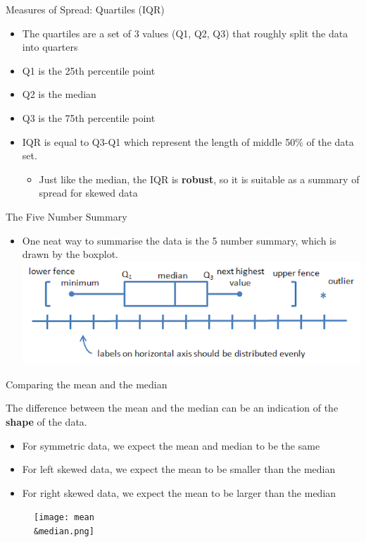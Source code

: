 \documentclass[ignorenonframetext,]{beamer}
\providecommand{\tightlist}{%
  \setlength{\itemsep}{0pt}\setlength{\parskip}{0pt}}
\begin{document}
\begin{frame}{Measures of Spread: Quartiles (IQR)}

\begin{itemize}
\item
  The quartiles are a set of 3 values (Q1, Q2, Q3) that roughly split
  the data into quarters
\item
  Q1 is the 25th percentile point
\item
  Q2 is the median
\item
  Q3 is the 75th percentile point
\item
  IQR is equal to Q3-Q1 which represent the length of middle 50\% of the
  data set.

  \begin{itemize}
  \tightlist
  \item
    Just like the median, the IQR is \textbf{robust}, so it is suitable
    as a summary of spread for skewed data
  \end{itemize}
\end{itemize}

\end{frame}

\begin{frame}{The Five Number Summary}

\begin{itemize}
\tightlist
\item
  One neat way to summarise the data is the 5 number summary, which is
  drawn by the boxplot. \includegraphics{boxplot.gif}
\end{itemize}

\end{frame}

\begin{frame}{Comparing the mean and the median}

The difference between the mean and the median can be an indication of
the \textbf{shape} of the data.

\begin{itemize}
\item
  For symmetric data, we expect the mean and median to be the same
\item
  For left skewed data, we expect the mean to be smaller than the median
\item
  For right skewed data, we expect the mean to be larger than the median
\end{itemize}

\begin{figure}
\centering
\texttt{[image: mean\\\&median.png]}
\caption{}
\end{figure}

\end{frame}
\end{document}
